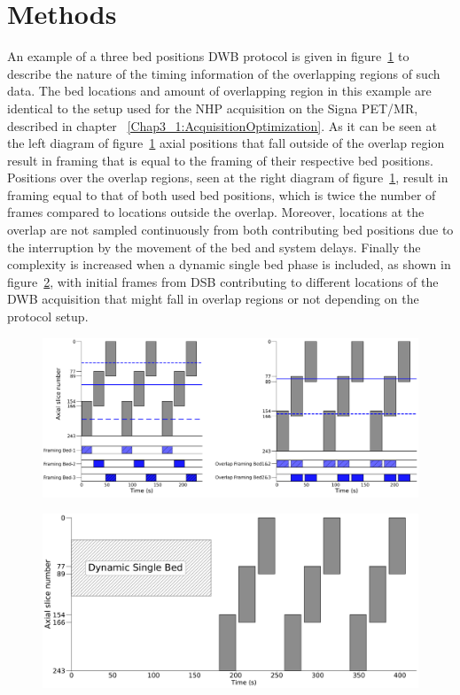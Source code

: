 \section{Methods}

An example of a three bed positions DWB protocol is given in figure~\ref{fig_3_3:OverlapFraming} to describe the nature of the timing information of the overlapping regions of such data. The bed locations and amount of overlapping region in this example are identical to the setup used for the NHP acquisition on the Signa PET/MR, described in chapter ~\ref{Chap3_1:AcquisitionOptimization}.
As it can be seen at the left diagram of figure~\ref{fig_3_3:OverlapFraming} axial positions that fall outside of the overlap region result in framing that is equal to the framing of their respective bed positions. Positions over the overlap regions, seen at the right diagram of figure~\ref{fig_3_3:OverlapFraming}, result in framing equal to that of both used bed positions, which is twice the number of frames compared to locations outside the overlap. Moreover, locations at the overlap are not sampled continuously from both contributing bed positions due to the interruption by the movement of the bed and system delays.  
Finally the complexity is increased when a dynamic single bed phase is included, as shown in  figure~\ref{fig_3_3:CompleteProtocolFraming}, with initial frames from DSB contributing to different locations of the DWB acquisition that might fall in overlap regions or not depending on the protocol setup. 

\begin{figure} [h!]
\centering
\includegraphics[scale=0.50,angle=0]{3_Results/3_3_DWB_Reconstruction/figures/OverlapTiming.pdf}
\caption{} 
\label{fig_3_3:OverlapFraming}
\end{figure} 

\begin{figure} [h!]
\centering
\includegraphics[scale=0.28,angle=0]{3_Results/3_3_DWB_Reconstruction/figures/CompleteProtocolTiming.pdf}
\caption{} 
\label{fig_3_3:CompleteProtocolFraming}
\end{figure} 

